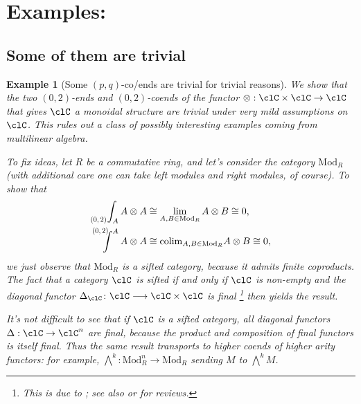 \documentclass[11pt]{amsart}
\newcommand*{\Scale}[2][4]{\scalebox{#1}{\ensuremath{#2}}}%
\def\colim{\mathrm{colim}}
\newcommand{\pqEnd}[3]{\mathop{\prescript{}{\Scale[.75]{\raisebox{.25em}{$(#1,#2)$}}}{\int_{#3}}}}
\newcommand{\pqCoend}[3]{%
  \mathchoice
    {\mathop{\prescript{\Scale[.75]{\raisebox{-.25em}{$(#1,#2)$}}\kern-.625em}{}{\int^{#3}}}}
    {\mathop{\prescript{\Scale[.75]{\raisebox{-.25em}{$(#1,#2)$}}\kern-.25em}{}{\int^{#3}}}}
    {\mathop{\prescript{\Scale[.75]{\raisebox{-.25em}{$(#1,#2)$}}\kern-.25em}{}{\int^{#3}}}}
    {\mathop{\prescript{\Scale[.75]{\raisebox{-.25em}{$(#1,#2)$}}\kern-.25em}{}{\int^{#3}}}}
  }
\newtheorem{example}{Example}
\begin{document}
\section{Examples:}
\label{sec:orgb57aafa}
\subsection{Some of them are trivial}
\begin{example}[Some $(p,q)$-co/ends are trivial for trivial reasons]\leavevmode
	We show that the two $(0,2)$-ends and $(0,2)$-coends of the functor $\otimes : \clC \times \clC \to \clC$ that gives $\clC$ a monoidal structure are trivial under very mild assumptions on $\clC$. This rules out a class of possibly interesting examples coming from multilinear algebra.

	To fix ideas, let $R$ be a commutative ring, and let's consider the category $\text{Mod}_R$ (with additional care one can take left modules and right modules, of course). To show that
	\begin{align*}
		\pqEnd{0}{2}{A}{A\otimes A}   & \cong \lim_{A,B\in\text{Mod}_R} A\otimes B    \cong 0, \\
		\pqCoend{0}{2}{A}{A\otimes A} & \cong \colim_{A,B\in\text{Mod}_R} A\otimes B  \cong 0,
	\end{align*}
	we just observe that $\text{Mod}_R$ is a sifted category, because it admits finite coproducts. The fact that a category $\clC$ is sifted if and only if $\clC$ is non-empty and the diagonal functor $\Delta_{\clC}\colon\clC\longrightarrow\clC\times\clC$ is final%
	\footnote{%
		This is due to \cite{gabriel-ulmer}; see also \cite[Proposition 5.3.2]{richter2020categories} or \cite[Theorem 2.15]{algebraic-theories-arv} for reviews.
	} %
	then yields the result.

	It's not difficult to see that if $\clC$ is a sifted category, all diagonal functors $\Delta : \clC \to \clC^n$ are final, because the product and composition of final functors is itself final. Thus the same result transports to higher coends of higher arity functors: for example, $\bigwedge^{k} : \text{Mod}_R^{n} \to \text{Mod}_R$ sending $M$ to $\bigwedge^{k}M$.
\end{example}
\end{document}
